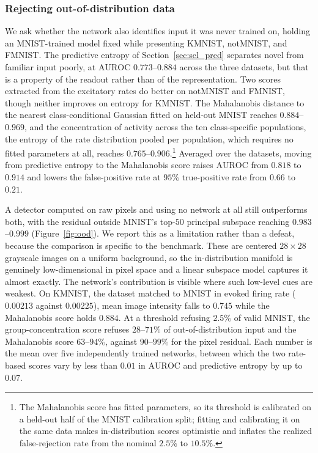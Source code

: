 
\subsubsection{Rejecting out-of-distribution data}
\label{sec:res:ood}
We ask whether the network also identifies input it was never trained on, holding an
MNIST-trained model fixed while presenting KMNIST, notMNIST, and FMNIST. The predictive
entropy of Section~\ref{sec:sel_pred} separates novel from familiar input poorly, at
$\mathrm{AUROC}$ $0.773$--$0.884$ across the three datasets, but that is a property of the
readout rather than of the representation. Two scores extracted from the excitatory rates do
better on notMNIST and FMNIST, though neither improves on entropy for KMNIST. The Mahalanobis
distance to the nearest class-conditional Gaussian fitted on held-out MNIST reaches
$0.884$--$0.969$, and the concentration of activity across the ten class-specific
populations, the entropy of the rate distribution pooled per population, which requires no
fitted parameters at all, reaches $0.765$--$0.906$.\footnote{The Mahalanobis score has fitted
parameters, so its threshold is calibrated on a held-out half of the MNIST calibration split;
fitting and calibrating it on the same data makes in-distribution scores optimistic and
inflates the realized false-rejection rate from the nominal $2.5\%$ to $10.5\%$.} Averaged
over the datasets, moving from predictive entropy to the Mahalanobis score raises
$\mathrm{AUROC}$ from $0.818$ to $0.914$ and lowers the false-positive rate at $95\%$
true-positive rate from $0.66$ to $0.21$.

A detector computed on raw pixels and using no network at all still outperforms both, with
the residual outside MNIST's top-$50$ principal subspace reaching $0.983$--$0.999$
(Figure~\ref{fig:ood}). We report this as a limitation rather than a defeat, because the
comparison is specific to the benchmark. These are centered $28 \times 28$ grayscale images on
a uniform background, so the in-distribution manifold is genuinely low-dimensional in pixel
space and a linear subspace model captures it almost exactly. The network's contribution is
visible where such low-level cues are weakest. On KMNIST, the dataset matched to MNIST in
evoked firing rate ($0.00213$ against $0.00225$), mean image intensity falls to $0.745$ while
the Mahalanobis score holds $0.884$. At a threshold refusing $2.5\%$ of valid MNIST, the
group-concentration score refuses $28$--$71\%$ of out-of-distribution input and the
Mahalanobis score $63$--$94\%$, against $90$--$99\%$ for the pixel residual. Each number is
the mean over five independently trained networks, between which the two rate-based scores
vary by less than $0.01$ in $\mathrm{AUROC}$ and predictive entropy by up to $0.07$.

